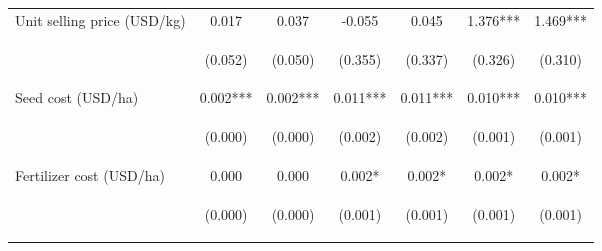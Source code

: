 \begin{center}
\begin{tabular}{lcccccc}
Unit selling price (USD/kg) & 0.017 & 0.037 & -0.055 & 0.045 & 1.376*** & 1.469*** \\
\vspace{4pt} & \begin{footnotesize}(0.052)\end{footnotesize} & \begin{footnotesize}(0.050)\end{footnotesize} & \begin{footnotesize}(0.355)\end{footnotesize} & \begin{footnotesize}(0.337)\end{footnotesize} & \begin{footnotesize}(0.326)\end{footnotesize} & \begin{footnotesize}(0.310)\end{footnotesize} \\
Seed cost (USD/ha) & 0.002*** & 0.002*** & 0.011*** & 0.011*** & 0.010*** & 0.010*** \\
\vspace{4pt} & \begin{footnotesize}(0.000)\end{footnotesize} & \begin{footnotesize}(0.000)\end{footnotesize} & \begin{footnotesize}(0.002)\end{footnotesize} & \begin{footnotesize}(0.002)\end{footnotesize} & \begin{footnotesize}(0.001)\end{footnotesize} & \begin{footnotesize}(0.001)\end{footnotesize} \\
Fertilizer cost (USD/ha) & 0.000 & 0.000 & 0.002* & 0.002* & 0.002* & 0.002* \\
\vspace{4pt} & \begin{footnotesize}(0.000)\end{footnotesize} & \begin{footnotesize}(0.000)\end{footnotesize} & \begin{footnotesize}(0.001)\end{footnotesize} & \begin{footnotesize}(0.001)\end{footnotesize} & \begin{footnotesize}(0.001)\end{footnotesize} & \begin{footnotesize}(0.001)\end{footnotesize} \\

\end{tabular}
\end{center}
